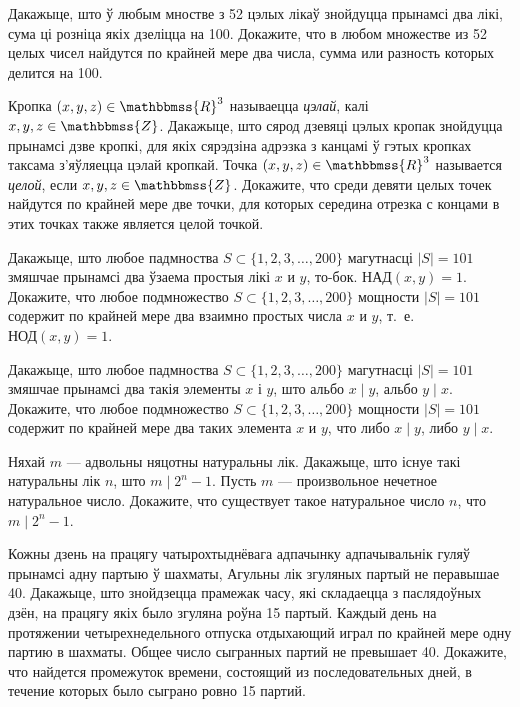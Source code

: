 




\begin{problemList}
	
\problemItemSimple
{Дакажыце, што ў любым мностве з 52 цэлых лікаў знойдуцца прынамсі два лікі, сума ці розніца якіх дзеліцца на 100.}
{Докажите, что в любом множестве из 52 целых чисел найдутся по крайней мере два числа, сумма или разность которых делится на 100.}

\bigskip

\problemItemSimple
{Кропка $(x, y, z) \in \mathbbmss{R}^3$ называецца \emph{цэлай}, калі $x, y, z \in \mathbbmss{Z}$. Дакажыце, што сярод дзевяці цэлых кропак знойдуцца прынамсі дзве кропкі, для якіх сярэдзіна адрэзка з канцамі ў гэтых кропках таксама з'яўляецца цэлай кропкай.}
{Точка $(x, y, z) \in \mathbbmss{R}^3$ называется \emph{целой}, если $x, y, z \in \mathbbmss{Z}$. Докажите, что среди девяти целых точек найдутся по крайней мере две точки, для которых середина отрезка с концами в этих точках также является целой точкой.}

\bigskip

\problemItemSimple
{Дакажыце, што любое падмноства $S \subset \{1, 2, 3, \ldots, 200\}$ магутнасці $|S| = 101$ змяшчае прынамсі два ўзаема простыя лікі $x$ и $y$, то-бок. $\text{НАД}(x, y) = 1$.}
{Докажите, что любое подмножество $S \subset \{1, 2, 3, \ldots, 200\}$ мощности $|S| = 101$ содержит по крайней мере два взаимно простых числа $x$ и $y$, т.~е. $\text{НОД}(x, y) = 1$.}

\bigskip

\problemItemSimple
{Дакажыце, што любое падмноства $S \subset \{1, 2, 3, \ldots, 200\}$ магутнасці $|S| = 101$ змяшчае прынамсі два такія элементы $x$ і $y$, што альбо $x \mid y$, альбо $y \mid x$.}
{Докажите, что любое подмножество $S \subset \{1, 2, 3, \ldots, 200\}$ мощности $|S| = 101$ содержит по крайней мере два таких элемента $x$ и $y$, что либо $x \mid y$, либо $y \mid x$.}

\bigskip

\problemItemSimple
{Няхай $m$ --- адвольны няцотны натуральны лік. Дакажыце, што існуе такі натуральны лік $n$, што $m \mid 2^n - 1$.}
{Пусть $m$ --- произвольное нечетное натуральное число. Докажите, что существует такое натуральное число $n$, что $m \mid 2^n - 1$.}

\bigskip

\problemItemSimple
{Кожны дзень на працягу чатырохтыднёвага адпачынку адпачывальнік гуляў прынамсі адну партыю ў шахматы, Агульны лік згуляных партый не перавышае 40. Дакажыце, што знойдзецца прамежак часу, які складаецца з паслядоўных дзён, на працягу якіх было згуляна роўна 15 партый.}
{Каждый день на протяжении четырехнедельного отпуска отдыхающий играл
по крайней мере одну партию в шахматы. Общее число сыгранных партий не
превышает 40. Докажите, что найдется промежуток времени, состоящий из
последовательных дней, в течение которых было сыграно ровно 15 партий.}
	
\end{problemList}


